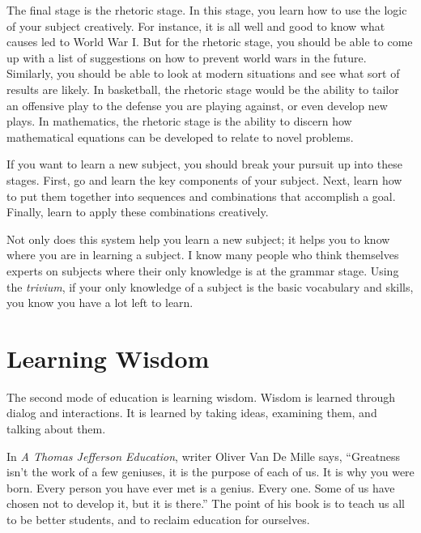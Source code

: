 \documentclass[letterpaper]{article}
\begin{document}
{\color{black}
The final stage is the rhetoric stage. In this stage, you learn how to
use the logic of your subject creatively. For instance, it is all well
and good to know what causes led to World War I. But for the rhetoric
stage, you should be able to come up with a list of suggestions on how
to prevent world wars in the future. Similarly, you should be able to
look at modern situations and see what sort of results are likely. In
basketball, the rhetoric stage would be the ability to tailor an
offensive play to the defense you are playing against, or even develop
new plays. In mathematics, the rhetoric stage is the ability to discern
how mathematical equations can be developed to relate to novel
problems.}

{\color{black}
If you want to learn a new subject, you should break your pursuit up
into these stages. First, go and learn the key components of your
subject. Next, learn how to put them together into sequences and
combinations that accomplish a goal. Finally, learn to apply these
combinations creatively.}

{\color{black}
Not only does this system help you learn a new subject; it helps you to
know where you are in learning a subject. I know many people who think
themselves experts on subjects where their only knowledge is at the
grammar stage. Using the \textit{trivium}, if your only knowledge of a
subject is the basic vocabulary and skills, you know you have a lot
left to learn. }

\section[Learning Wisdom]{Learning Wisdom}
{\color{black}
The second mode of education is learning wisdom. Wisdom is learned
through dialog and interactions. It is learned by taking ideas,
examining them, and talking about them. }

{\color{black}
In \textit{A Thomas Jefferson Education}, writer Oliver Van De Mille
says, “Greatness isn’t the work of a few geniuses, it is the purpose of
each of us. It is why you were born. Every person you have ever met is
a genius. Every one. Some of us have chosen not to develop it, but it
is there.”  The point of his book is to teach us all to be better
students, and to reclaim education for ourselves.}
\end{document}
